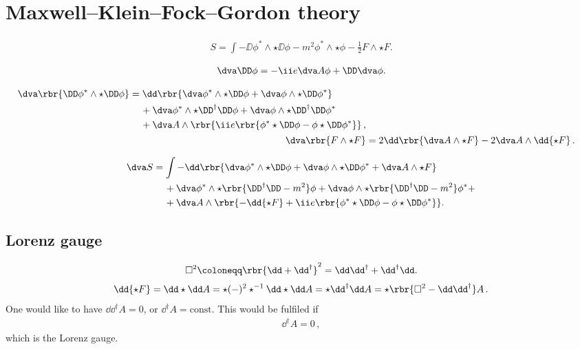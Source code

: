 \documentclass[a4paper]{article}
\numberwithin{equation}{subsection}
\begin{document}
\section{Maxwell--Klein--Fock--Gordon theory}

\begin{align}
S = \int -\DD\phi^*\wedge\star\DD\phi - m^2 \phi^*\wedge\star\phi
	-\frac{1}{2} F \wedge \star F.
\end{align}

\begin{align}
\dva \DD\phi = -\ii e \dva A\phi + \DD \dva \phi.
\end{align}

\begin{align}
\begin{split}
\dva\rbr{\DD \phi^*\wedge\star\DD\phi} &= 
\dd\rbr{\dva\phi^*\wedge\star\DD\phi + \dva\phi\wedge\star\DD\phi^*}
\\
&\quad\,+
\dva\phi^*\wedge\star\DD^{\dagger}\DD\phi +
\dva\phi\wedge\star\DD^{\dagger}\DD\phi^*
\\
&\quad\,+
\dva A \wedge\rbr{\ii e \rbr{\phi^* \star\DD\phi - \phi\star\DD\phi^*}}\,,
\end{split}
\\
\dva\rbr{F\wedge\star F} &=
	2 \dd\rbr{\dva A \wedge \star F} - 2 \dva A \wedge \dd {\star F}\,.
\end{align}

\begin{align}
\dva S &= \int -\dd\rbr{\dva\phi^*\wedge\star\DD\phi + \dva\phi\wedge\star\DD\phi^* + \dva A \wedge\star F}
\nonumber \\
&\quad\,+
\dva\phi^*\wedge\star\rbr{\DD^{\dagger}\DD-m^2}\phi +
\dva\phi\wedge\star\rbr{\DD^{\dagger}\DD-m^2}\phi^* +
\nonumber \\
&\quad\,+
\dva A\wedge\rbr{-\dd{\star F} +
	\ii e \rbr{\phi^* \star\DD\phi - \phi \star\DD\phi^*}}.
\end{align}

\subsection{Lorenz gauge}

\begin{align}
\square^2 \coloneqq \rbr{\dd + \dd^{\dagger}}^2 = \dd \dd^{\dagger} + \dd^{\dagger} \dd.
\end{align}
\begin{align}
\dd{\star F} = \dd\star \dd A = \star (-)^2 \star^{-1}\dd\star\dd A = \star \dd^{\dagger} \dd A = \star\rbr{\square^2 - \dd \dd^{\dagger}} A\,.
\end{align}
One would like to have $\dd \dd^{\dagger} A = 0$, or $\dd^{\dagger} A = \text{const}$. This would be fulfiled if
\begin{align}
\dd^{\dagger} A = 0\,,
\end{align}
which is the Lorenz gauge\cite{Lorenz1867,Bladel1991a,Bladel1991b}.
\end{document}
